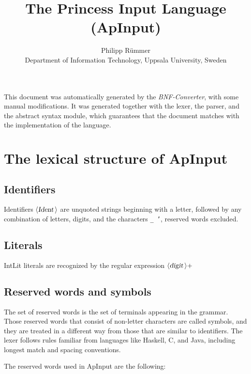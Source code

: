 \documentclass[a4paper,11pt]{article}
\author{Philipp R\"ummer\\
  Department
  of Information Technology, Uppsala University, Sweden}
\title{The Princess Input Language\\
  (ApInput)}
\begin{document}
\maketitle

\newcommand{\emptyP}{\mbox{$\epsilon$}}
\newcommand{\terminal}[1]{\mbox{{\texttt {#1}}}}
\newcommand{\nonterminal}[1]{\mbox{$\langle \mbox{{\sl #1 }} \! \rangle$}}
\newcommand{\arrow}{\mbox{::=}}
\newcommand{\delimit}{\mbox{$|$}}
\newcommand{\reserved}[1]{\mbox{{\texttt {#1}}}}
\newcommand{\literal}[1]{\mbox{{\texttt {#1}}}}
\newcommand{\symb}[1]{\mbox{{\texttt {#1}}}}

This document was automatically generated by the {\em BNF-Converter},
with some manual modifications. It was generated together with the
lexer, the parser, and the abstract syntax module, which guarantees
that the document matches with the implementation of the language.

\section*{The lexical structure of ApInput}
\subsection*{Identifiers}
Identifiers \nonterminal{Ident} are unquoted strings beginning with a letter,
followed by any combination of letters, digits, and the characters {\tt \_ '},
reserved words excluded.


\subsection*{Literals}


IntLit literals are recognized by the regular expression
\({\nonterminal{digit}}+\)


\subsection*{Reserved words and symbols}
The set of reserved words is the set of terminals appearing in the grammar. Those reserved words that consist of non-letter characters are called symbols, and they are treated in a different way from those that are similar to identifiers. The lexer follows rules familiar from languages like Haskell, C, and Java, including longest match and spacing conventions.

The reserved words used in ApInput are the following: \\
\end{document}
